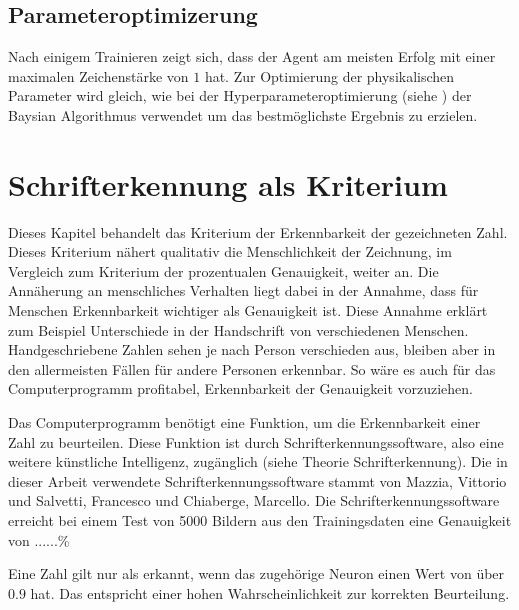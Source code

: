 
\subsection*{Parameteroptimizerung}
Nach einigem Trainieren zeigt sich, dass der Agent am meisten Erfolg mit einer
maximalen Zeichenstärke von $1$ hat. Zur Optimierung der physikalischen
Parameter wird gleich, wie bei der Hyperparameteroptimierung (siehe %
) der Baysian Algorithmus verwendet um
das bestmöglichste Ergebnis zu erzielen.





\section{Schrifterkennung als Kriterium}
Dieses Kapitel behandelt das Kriterium der Erkennbarkeit der gezeichneten Zahl.
Dieses Kriterium nähert qualitativ die Menschlichkeit der Zeichnung, im
Vergleich zum Kriterium der prozentualen Genauigkeit, weiter an. Die Annäherung
an menschliches Verhalten liegt dabei in der Annahme, dass für Menschen
Erkennbarkeit wichtiger als Genauigkeit ist. Diese Annahme erklärt zum Beispiel
Unterschiede in der Handschrift von verschiedenen Menschen. Handgeschriebene
Zahlen sehen je nach Person verschieden aus, bleiben aber in den allermeisten
Fällen für andere Personen erkennbar. So wäre es auch für das Computerprogramm
profitabel, Erkennbarkeit der Genauigkeit vorzuziehen.

Das Computerprogramm benötigt eine Funktion, um die Erkennbarkeit einer Zahl zu
beurteilen. Diese Funktion ist durch Schrifterkennungssoftware, also eine  %
weitere künstliche Intelligenz, zugänglich (siehe Theorie Schrifterkennung). Die  %
in dieser Arbeit verwendete Schrifterkennungssoftware stammt von Mazzia,
Vittorio und Salvetti, Francesco und Chiaberge, Marcello.
\cite{mazzia_salvetti_efficient-capsnet_2021} Die Schrifterkennungssoftware
erreicht bei einem Test von 5000 Bildern aus den Trainingsdaten eine Genauigkeit
von ......\%

Eine Zahl gilt nur als erkannt, wenn das zugehörige Neuron einen Wert von über $0.9$
hat. Das entspricht einer hohen Wahrscheinlichkeit zur korrekten Beurteilung. 

